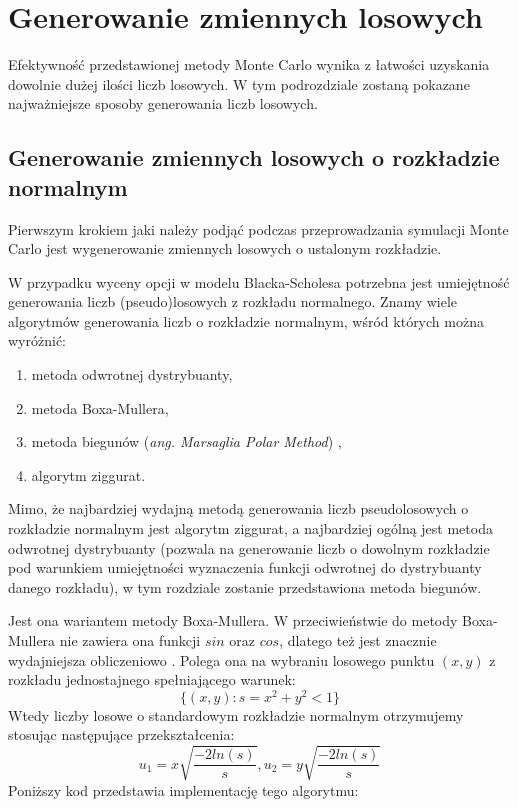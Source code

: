 \documentclass{pracamgr}
\begin{document}
\section{Generowanie zmiennych losowych}
\label{sec:genRV}

Efektywność przedstawionej metody Monte Carlo wynika z łatwości uzyskania dowolnie dużej
ilości liczb losowych. 
W tym podrozdziale zostaną pokazane najważniejsze sposoby generowania liczb losowych.


\subsection{Generowanie zmiennych losowych o rozkładzie normalnym}

Pierwszym krokiem jaki należy podjąć podczas przeprowadzania symulacji Monte Carlo jest 
wygenerowanie zmiennych losowych o ustalonym rozkładzie.

W przypadku wyceny opcji w modelu Blacka-Scholesa potrzebna jest umiejętność generowania liczb 
(pseudo)losowych z rozkładu normalnego. Znamy wiele algorytmów generowania liczb o rozkładzie
normalnym, wśród których można wyróżnić:
\begin{enumerate}
  \item metoda odwrotnej dystrybuanty,
  \item metoda Boxa-Mullera,
  \item metoda biegunów (\textit{ang. Marsaglia Polar Method}) \cite{Marsaglia},
  \item algorytm ziggurat.
\end{enumerate}

Mimo, że najbardziej wydajną metodą generowania liczb pseudolosowych o rozkładzie normalnym jest 
algorytm ziggurat, a najbardziej ogólną jest metoda odwrotnej dystrybuanty (pozwala na generowanie 
liczb o dowolnym rozkładzie pod warunkiem umiejętności wyznaczenia funkcji odwrotnej do dystrybuanty 
danego rozkładu), w tym rozdziale zostanie przedstawiona metoda biegunów.

Jest ona wariantem metody Boxa-Mullera. W przeciwieństwie do 
metody Boxa-Mullera nie zawiera ona funkcji $sin$ oraz $cos$, dlatego też jest znacznie wydajniejsza 
obliczeniowo \cite{Korn}.
Polega ona na wybraniu losowego punktu $(x,y)$ z rozkładu jednostajnego spełniającego warunek:
\begin{equation}
  \{(x, y): s = x^2 + y^2 < 1\}
\end{equation}
Wtedy liczby losowe o standardowym rozkładzie normalnym otrzymujemy stosując następujące 
przekształcenia:
\begin{equation}
  u_1 = x \sqrt{\frac{-2ln(s)}{s}}, u_2 = y \sqrt{\frac{-2ln(s)}{s}}
\end{equation}
Poniższy kod przedstawia implementację tego algorytmu:
\end{document}
